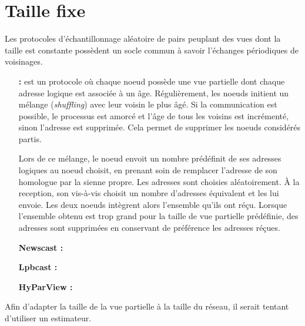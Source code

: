 

\section{Taille fixe}

Les protocoles d'échantillonnage aléatoire de pairs peuplant des vues dont la
taille est constante possèdent un socle commun à savoir l'échanges périodiques
de voisinages.

\begin{itemize}
\item [\textbf{\CYCLON :}] est un protocole où chaque noeud possède une vue
  partielle dont chaque adresse logique est associée à un âge. Régulièrement,
  les noeuds initient un mélange (\emph{shuffling}) avec leur voisin le plus
  âgé. Si la communication est possible, le processus est amorcé et l'âge de
  tous les voisins est incrémenté, sinon l'adresse est supprimée. Cela permet de
  supprimer les noeuds considérés partis.

  Lors de ce mélange, le noeud envoit un nombre prédéfinit de ses adresses
  logiques au noeud choisit, en prenant soin de remplacer l'adresse de son
  homologue par la sienne propre. Les adresses sont choisies aléatoirement. À la
  reception, son vis-à-vis choisit un nombre d'adresses équivalent et les lui
  envoie. Les deux noeuds intègrent alors l'ensemble qu'ils ont réçu. Lorsque
  l'ensemble obtenu est trop grand pour la taille de vue partielle prédéfinie,
  des adresses sont supprimées en conservant de préférence les adresses réçues.
\item [\textbf{Newscast :}]
\item [\textbf{Lpbcast :}]
\item [\textbf{HyParView :}]
\end{itemize}

Afin d'adapter la taille de la vue partielle à la taille du réseau, il serait
tentant d'utiliser un estimateur.
